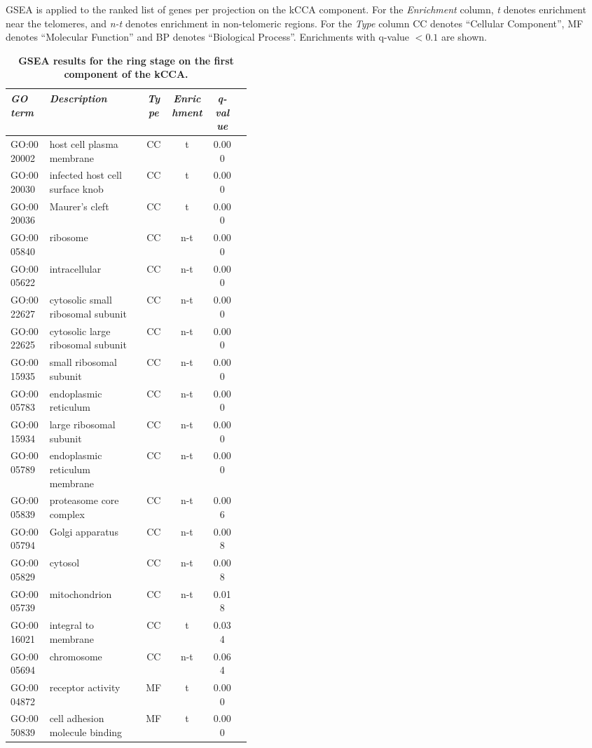 \begin{table}
\caption{{\bf GSEA results for the ring stage on the first component of the
kCCA.}}
{\normalsize GSEA is applied to the ranked list of genes per projection on the kCCA
component. For the \emph{Enrichment} column, \emph{t} denotes enrichment near the
telomeres, and \emph{n-t} denotes enrichment in non-telomeric regions.
For the \emph{Type} column CC denotes ``Cellular Component'',
MF denotes ``Molecular Function'' and BP denotes ``Biological Process''.
Enrichments with q-value $< 0.1$ are shown. }
\vspace{10pt}
\begin{center}
\begin{tabular}{lp{0.4\linewidth}cccc}
\hline
\emph{GO term }&  \emph{Description} & \emph{Type} & \emph{Enrichment} & \emph{q-value}  \\
\hline
GO:0020002 & host cell plasma membrane & CC & t & 0.000\\
GO:0020030 & infected host cell surface knob & CC & t & 0.000\\
GO:0020036 & Maurer's cleft & CC & t & 0.000\\
GO:0005840 & ribosome & CC & n-t & 0.000\\
GO:0005622 & intracellular & CC & n-t & 0.000\\
GO:0022627 & cytosolic small ribosomal subunit & CC & n-t & 0.000\\
GO:0022625 & cytosolic large ribosomal subunit & CC & n-t & 0.000\\
GO:0015935 & small ribosomal subunit & CC & n-t & 0.000\\
GO:0005783 & endoplasmic reticulum & CC & n-t & 0.000\\
GO:0015934 & large ribosomal subunit & CC & n-t & 0.000\\
GO:0005789 & endoplasmic reticulum membrane & CC & n-t & 0.000\\
GO:0005839 & proteasome core complex & CC & n-t & 0.006\\
GO:0005794 & Golgi apparatus & CC & n-t & 0.008\\
GO:0005829 & cytosol & CC & n-t & 0.008\\
GO:0005739 & mitochondrion & CC & n-t & 0.018\\
GO:0016021 & integral to membrane & CC & t & 0.034\\
GO:0005694 & chromosome & CC & n-t & 0.064\\
GO:0004872 & receptor activity & MF & t & 0.000\\
GO:0050839 & cell adhesion molecule binding & MF & t & 0.000\\

\end{tabular}
\end{center}
\end{table}
